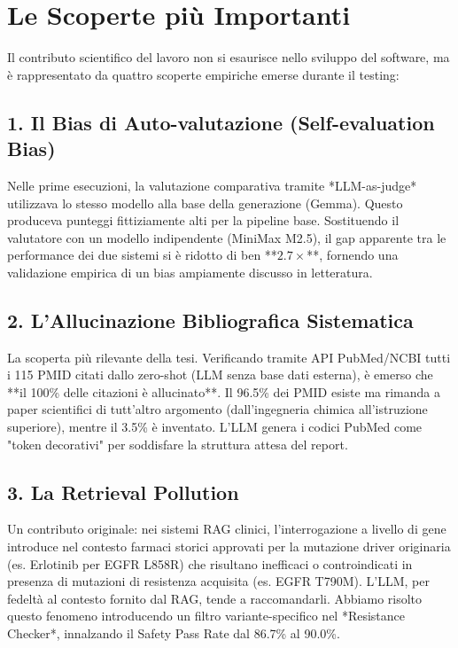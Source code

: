 \documentclass[12pt, a4paper]{article}
\begin{document}
\section{Le Scoperte più Importanti}
Il contributo scientifico del lavoro non si esaurisce nello sviluppo del software, ma è rappresentato da quattro scoperte empiriche emerse durante il testing:

\subsection{1. Il Bias di Auto-valutazione (Self-evaluation Bias)}
Nelle prime esecuzioni, la valutazione comparativa tramite *LLM-as-judge* utilizzava lo stesso modello alla base della generazione (Gemma). Questo produceva punteggi fittiziamente alti per la pipeline base. Sostituendo il valutatore con un modello indipendente (MiniMax M2.5), il gap apparente tra le performance dei due sistemi si è ridotto di ben **$2.7\times$**, fornendo una validazione empirica di un bias ampiamente discusso in letteratura.

\subsection{2. L'Allucinazione Bibliografica Sistematica}
La scoperta più rilevante della tesi. Verificando tramite API PubMed/NCBI tutti i 115 PMID citati dallo zero-shot (LLM senza base dati esterna), è emerso che **il 100\% delle citazioni è allucinato**. Il 96.5\% dei PMID esiste ma rimanda a paper scientifici di tutt'altro argomento (dall'ingegneria chimica all'istruzione superiore), mentre il 3.5\% è inventato. L'LLM genera i codici PubMed come "token decorativi" per soddisfare la struttura attesa del report.

\subsection{3. La Retrieval Pollution}
Un contributo originale: nei sistemi RAG clinici, l'interrogazione a livello di gene introduce nel contesto farmaci storici approvati per la mutazione driver originaria (es. Erlotinib per EGFR L858R) che risultano inefficaci o controindicati in presenza di mutazioni di resistenza acquisita (es. EGFR T790M). L'LLM, per fedeltà al contesto fornito dal RAG, tende a raccomandarli. Abbiamo risolto questo fenomeno introducendo un filtro variante-specifico nel *Resistance Checker*, innalzando il Safety Pass Rate dal 86.7\% al 90.0\%.
\end{document}
